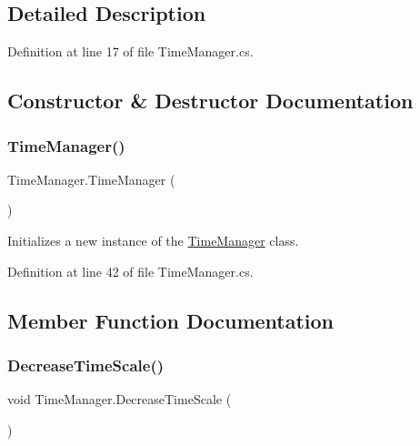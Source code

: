 \subsection{Detailed Description}


Definition at line 17 of file Time\+Manager.\+cs.



\subsection{Constructor \& Destructor Documentation}
\mbox{\label{class_time_manager_a77e028375607efbc2f94d83729f73f77}} 
\subsubsection{\texorpdfstring{Time\+Manager()}{TimeManager()}}
{\footnotesize\ttfamily Time\+Manager.\+Time\+Manager (\begin{DoxyParamCaption}{ }\end{DoxyParamCaption})}



Initializes a new instance of the \hyperlink{class_time_manager}{Time\+Manager} class. 



Definition at line 42 of file Time\+Manager.\+cs.



\subsection{Member Function Documentation}
\mbox{\label{class_time_manager_a23aecf449e33a25ab34cd685d95419f4}} 
\subsubsection{\texorpdfstring{Decrease\+Time\+Scale()}{DecreaseTimeScale()}}
{\footnotesize\ttfamily void Time\+Manager.\+Decrease\+Time\+Scale (\begin{DoxyParamCaption}{ }\end{DoxyParamCaption})}



